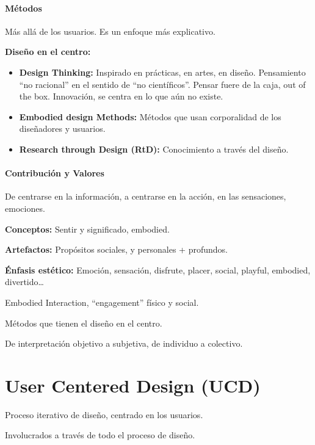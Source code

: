 \documentclass[12pt]{report} %
\begin{document}
\hypertarget{muxe9todos-2}{%
\paragraph{Métodos}\label{muxe9todos-2}}

Más allá de los usuarios. Es un enfoque más explicativo.

\textbf{Diseño en el centro:}

\begin{itemize}
\item
  \textbf{Design Thinking:} Inspirado en prácticas, en artes, en diseño.
  Pensamiento ``no racional'' en el sentido de ``no científicos''.
  Pensar fuere de la caja, out of the box. Innovación, se centra en lo
  que aún no existe.
\item
  \textbf{Embodied design Methods:} Métodos que usan corporalidad de los
  diseñadores y usuarios.
\item
  \textbf{Research through Design (RtD):} Conocimiento a través del
  diseño.
\end{itemize}

\hypertarget{contribuciuxf3n-y-valores-2}{%
\paragraph{Contribución y Valores}\label{contribuciuxf3n-y-valores-2}}

De centrarse en la información, a centrarse en la acción, en las
sensaciones, emociones.

\textbf{Conceptos:} Sentir y significado, embodied.

\textbf{Artefactos:} Propósitos sociales, y personales + profundos.

\textbf{Énfasis estético:} Emoción, sensación, disfrute, placer, social,
playful, embodied, divertido\ldots{}

Embodied Interaction, ``engagement'' físico y social.

Métodos que tienen el diseño en el centro.

De interpretación objetivo a subjetiva, de individuo a colectivo.

\section{User Centered Design (UCD)}

Proceso iterativo de diseño, centrado en los usuarios.

Involucrados a través de todo el proceso de diseño.
\end{document}
